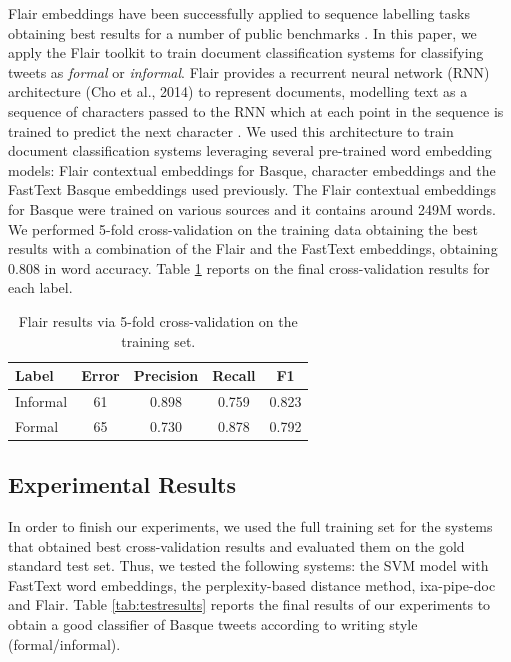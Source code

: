 \documentclass[information,article,submit,moreauthors,pdftex,10pt,a4paper]{Definitions/mdpi}
\begin{document}
Flair embeddings have been successfully applied to sequence labelling tasks obtaining best results for a number of public benchmarks \cite{akbik2018contextual}. In this paper, we apply the Flair toolkit to train document classification systems for classifying tweets as \emph{formal} or \emph{informal}. Flair provides a recurrent neural network (RNN) architecture (Cho et al., 2014) to represent documents, modelling text as a sequence of characters passed to the RNN which at each point in the sequence is trained to predict the next character \cite{akbik2018contextual}. We used this architecture to train document classification systems leveraging several pre-trained word embedding models: Flair contextual embeddings for Basque, character embeddings and the FastText Basque embeddings used previously. The Flair contextual embeddings for Basque were trained on various sources and it contains around 249M words. We performed 5-fold cross-validation on the training data obtaining the best results with a combination of the Flair and the FastText embeddings, obtaining 0.808 in word accuracy. Table \ref{tab:flair} reports on the final cross-validation results for each label.

\begin{table}[H]
  \centering
  \begin{tabular}{lcccc}
    \hline
    Label & Error & Precision & Recall & F1 \\ \hline \hline
    Informal & 61 & 0.898 & 0.759  & 0.823 \\
    Formal & 65 & 0.730 & 0.878 & 0.792 \\ \hline
  \end{tabular}
  \caption{Flair results via 5-fold cross-validation on the training set.}
  \label{tab:flair}
\end{table}


\subsection{Experimental Results}\label{sec:experimental-results}

In order to finish our experiments, we used the full training set for the systems that obtained best cross-validation results and evaluated them on the gold standard test set. Thus, we tested the following systems: the SVM model with FastText word embeddings, the perplexity-based distance method, ixa-pipe-doc and Flair. Table \ref{tab:testresults} reports the final results of our experiments to obtain a good classifier of Basque tweets according to writing style (formal/informal).
\end{document}
